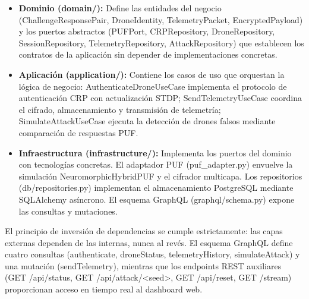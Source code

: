 \begin{itemize}
    \item \textbf{Dominio (domain/):} Define las entidades del negocio (ChallengeResponsePair, DroneIdentity, TelemetryPacket, EncryptedPayload) y los puertos abstractos (PUFPort, CRPRepository, DroneRepository, SessionRepository, TelemetryRepository, AttackRepository) que establecen los contratos de la aplicación sin depender de implementaciones concretas.
    \item \textbf{Aplicación (application/):} Contiene los casos de uso que orquestan la lógica de negocio: AuthenticateDroneUseCase implementa el protocolo de autenticación CRP con actualización STDP; SendTelemetryUseCase coordina el cifrado, almacenamiento y transmisión de telemetría; SimulateAttackUseCase ejecuta la detección de drones falsos mediante comparación de respuestas PUF.
    \item \textbf{Infraestructura (infrastructure/):} Implementa los puertos del dominio con tecnologías concretas. El adaptador PUF (puf\_adapter.py) envuelve la simulación NeuromorphicHybridPUF y el cifrador multicapa. Los repositorios (db/repositories.py) implementan el almacenamiento PostgreSQL mediante SQLAlchemy asíncrono. El esquema GraphQL (graphql/schema.py) expone las consultas y mutaciones.
\end{itemize}

El principio de inversión de dependencias se cumple estrictamente: las capas externas dependen de las internas, nunca al revés. El esquema GraphQL define cuatro consultas (authenticate, droneStatus, telemetryHistory, simulateAttack) y una mutación (sendTelemetry), mientras que los endpoints REST auxiliares (GET /api/status, GET /api/attack/<seed>, GET /api/reset, GET /stream) proporcionan acceso en tiempo real al dashboard web.

